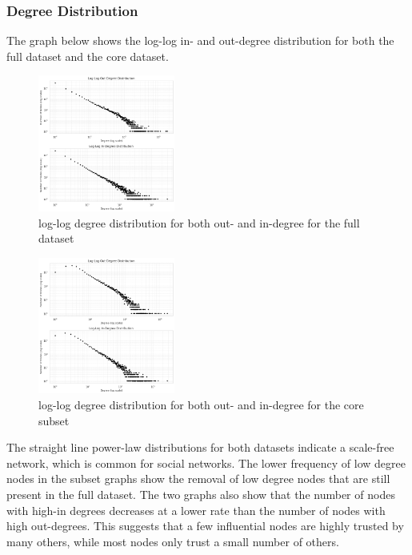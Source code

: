 \documentclass[conference]{IEEEtran}
\begin{document}
\subsubsection{Degree Distribution}
The graph below shows the log-log in- and out-degree distribution for both the full dataset and the core dataset. 

\begin{figure}[H]
    \centerline{\includegraphics[width=0.4\textwidth]{img/loglog_graph.png}}
    \centering
    \caption{log-log degree distribution for both out- and in-degree for the full dataset}
    \label{fig:log_dataset}
\end{figure}

\begin{figure}[H]
    \centerline{\includegraphics[width=0.4\textwidth]{img/loglog_core.png}}
    \centering
    \caption{log-log degree distribution for both out- and in-degree for the core subset}
    \label{fig:log_core}
\end{figure}

The straight line power-law distributions for both datasets indicate a scale-free network, which is common for social networks. The lower frequency of low degree nodes in the subset graphs show the removal of low degree nodes that are still present in the full dataset. The two graphs also show that the number of nodes with high-in degrees decreases at a lower rate than the number of nodes with high out-degrees. This suggests that a few influential nodes are highly trusted by many others, while most nodes only trust a small number of others. 
\end{document}

